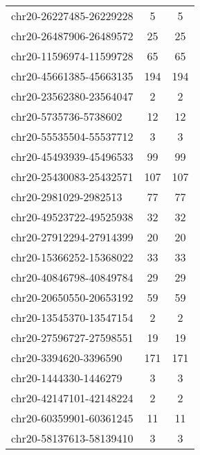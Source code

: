 \begin{longtable}{lSS}
	chr20-26227485-26229228 & 5      & 5                                         \\
	chr20-26487906-26489572 & 25     & 25                                        \\
	chr20-11596974-11599728 & 65     & 65                                        \\
	chr20-45661385-45663135 & 194    & 194                                       \\
	chr20-23562380-23564047 & 2      & 2                                         \\
	chr20-5735736-5738602   & 12     & 12                                        \\
	chr20-55535504-55537712 & 3      & 3                                         \\
	chr20-45493939-45496533 & 99     & 99                                        \\
	chr20-25430083-25432571 & 107    & 107                                       \\
	chr20-2981029-2982513   & 77     & 77                                        \\
	chr20-49523722-49525938 & 32     & 32                                        \\
	chr20-27912294-27914399 & 20     & 20                                        \\
	chr20-15366252-15368022 & 33     & 33                                        \\
	chr20-40846798-40849784 & 29     & 29                                        \\
	chr20-20650550-20653192 & 59     & 59                                        \\
	chr20-13545370-13547154 & 2      & 2                                         \\
	chr20-27596727-27598551 & 19     & 19                                        \\
	chr20-3394620-3396590   & 171    & 171                                       \\
	chr20-1444330-1446279   & 3      & 3                                         \\
	chr20-42147101-42148224 & 2      & 2                                         \\
	chr20-60359901-60361245 & 11     & 11                                        \\
	chr20-58137613-58139410 & 3      & 3                                         \\

\end{longtable}
